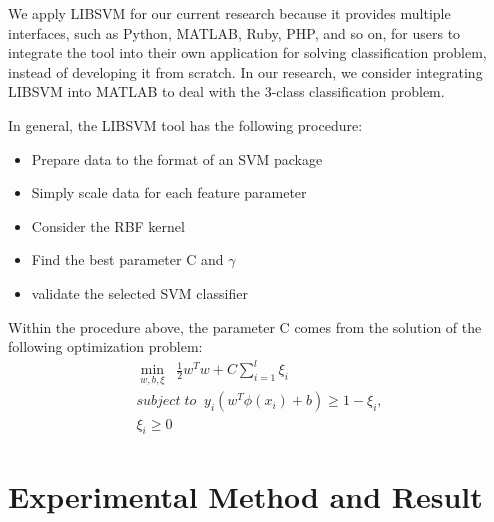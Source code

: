 We apply LIBSVM for our current research because it provides multiple interfaces, such as Python, MATLAB, Ruby, PHP, and so on, for users to integrate the tool into their own application for solving classification problem, instead of developing it from scratch. In our research, we consider integrating LIBSVM into MATLAB to deal with the 3-class classification problem.\par
In general, the LIBSVM tool has the following procedure:
\begin{itemize}
\item Prepare data to the format of an SVM package
\item Simply scale data for each feature parameter
\item Consider the RBF kernel
\item Find the best parameter C and $\gamma$
\item validate the selected SVM classifier
\end{itemize}
Within the procedure above, the parameter C comes from the solution of the following optimization problem:
\begin{align}
    \min\limits_{w,b,\xi}\;\; \frac{1}{2}w^Tw + C\sum_{i=1}^{l}\xi_i\nonumber \\subject\;to\;\;y_i(w^T\phi(x_i)+b) \geq 1 - \xi_i,\\\xi_i\geq0\nonumber
\end{align}


\section{Experimental Method and Result}
